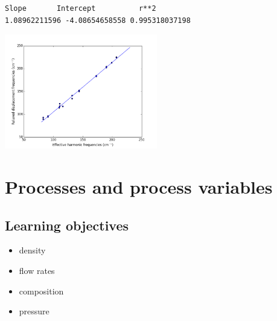\documentclass[11pt]{article}
\begin{document}
\begin{verbatim}
Slope       Intercept          r**2
1.08962211596 -4.08654658558 0.995318037198
\end{verbatim}

\includegraphics[width=0.5\textwidth]{./figs/freq.png}

\newpage

\section{Processes and process variables}
\label{sec-4}
\subsection{Learning objectives}
\label{sec-4-1}
\begin{itemize}
\item density
\item flow rates
\item composition
\item pressure
\end{itemize}
\end{document}
